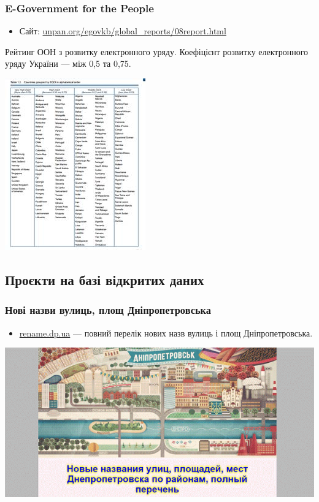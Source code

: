 \subsubsection{E-Government for the People}

\begin{itemize}
    \item Сайт: \href{http://www.unpan.org/egovkb/global_reports/08report.html}{unpan.org/egovkb/global_reports/08report.html}
\end{itemize}

Рейтинг ООН з розвитку електронного уряду. Коефіцієнт розвитку електронного уряду України — між 0,5 та 0,75.

\includegraphics{images/016.jpg}

\subsection{Проєкти на базі відкритих даних}

\subsubsection{Нові назви вулиць, площ Дніпропетровська}

\begin{itemize}
    \item \href{http://rename.dp.ua/}{rename.dp.ua} — повний перелік нових назв вулиць і площ Дніпропетровська.
\end{itemize}

\includegraphics{images/017.gif}

